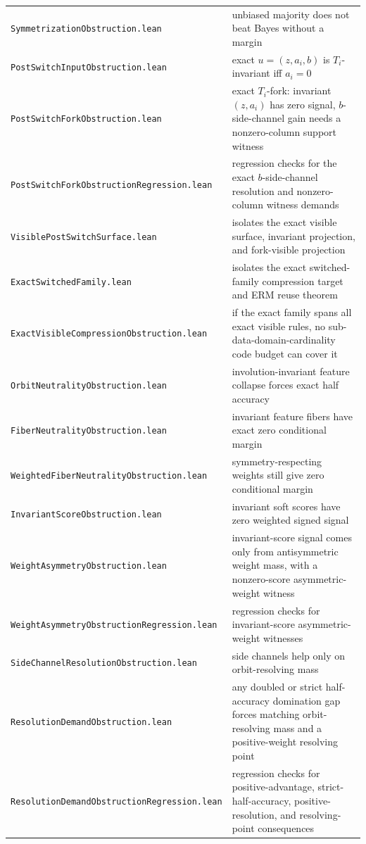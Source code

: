 \documentclass[11pt]{article}
\theoremstyle{remark}
\begin{document}
\begin{center}
\begin{tabular}{ll}
\texttt{SymmetrizationObstruction.lean} & unbiased majority does not beat Bayes without a margin \\
\texttt{PostSwitchInputObstruction.lean} & exact \(u=(z,a_i,b)\) is \(T_i\)-invariant iff \(a_i=0\) \\
\texttt{PostSwitchForkObstruction.lean} & exact \(T_i\)-fork: invariant \((z,a_i)\) has zero signal, \(b\)-side-channel gain needs a nonzero-column support witness \\
\texttt{PostSwitchForkObstructionRegression.lean} & regression checks for the exact \(b\)-side-channel resolution and nonzero-column witness demands \\
\texttt{VisiblePostSwitchSurface.lean} & isolates the exact visible surface, invariant projection, and fork-visible projection \\
\texttt{ExactSwitchedFamily.lean} & isolates the exact switched-family compression target and ERM reuse theorem \\
\texttt{ExactVisibleCompressionObstruction.lean} & if the exact family spans all exact visible rules, no sub-data-domain-cardinality code budget can cover it \\
\texttt{OrbitNeutralityObstruction.lean} & involution-invariant feature collapse forces exact half accuracy \\
\texttt{FiberNeutralityObstruction.lean} & invariant feature fibers have exact zero conditional margin \\
\texttt{WeightedFiberNeutralityObstruction.lean} & symmetry-respecting weights still give zero conditional margin \\
\texttt{InvariantScoreObstruction.lean} & invariant soft scores have zero weighted signed signal \\
\texttt{WeightAsymmetryObstruction.lean} & invariant-score signal comes only from antisymmetric weight mass, with a nonzero-score asymmetric-weight witness \\
\texttt{WeightAsymmetryObstructionRegression.lean} & regression checks for invariant-score asymmetric-weight witnesses \\
\texttt{SideChannelResolutionObstruction.lean} & side channels help only on orbit-resolving mass \\
\texttt{ResolutionDemandObstruction.lean} & any doubled or strict half-accuracy domination gap forces matching orbit-resolving mass and a positive-weight resolving point \\
\texttt{ResolutionDemandObstructionRegression.lean} & regression checks for positive-advantage, strict-half-accuracy, positive-resolution, and resolving-point consequences \\

\end{tabular}
\end{center}
\end{document}
